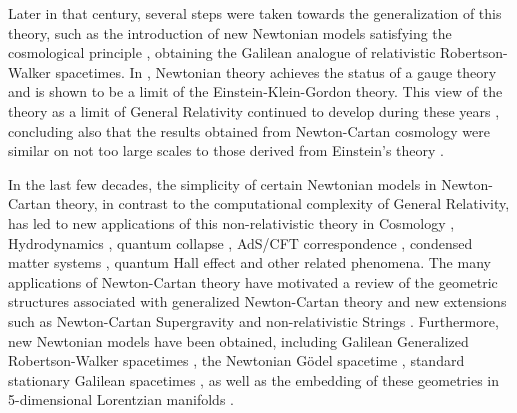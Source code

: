 \documentclass[12pt]{article}
\begin{document}
Later in that century, several steps were taken towards the generalization of this theory, such as the introduction of new Newtonian models satisfying the cosmological principle \cite{Muler1983}, obtaining the Galilean analogue of relativistic Robertson-Walker spacetimes. In \cite{Duval}, Newtonian theory achieves the status of a gauge theory and is shown to be a limit of the Einstein-Klein-Gordon theory. This view of the theory as a limit of General Relativity continued to develop during these years \cite{Leih}, concluding also that the results obtained from Newton-Cartan cosmology were similar on not too large scales to those derived from Einstein's theory \cite{Rod, Ruede}.

In the last few decades, the simplicity of certain Newtonian models in Newton-Cartan theory, in contrast to the computational complexity of General Relativity, has led to new applications of this non-relativistic theory in Cosmology \cite{Bra}, Hydrodynamics \cite{Geracie2}, quantum collapse \cite{Pen}, AdS/CFT correspondence \cite{Lin}, condensed matter systems \cite{Brau}, quantum Hall effect \cite{Gera} and other related phenomena. The many applications of Newton-Cartan theory have motivated a review of the geometric structures associated with generalized Newton-Cartan theory \cite{Bernal} and new extensions such as Newton-Cartan Supergravity \cite{Roel3} and non-relativistic Strings \cite{Roel, Berg}. Furthermore, new Newtonian models have been obtained, including Galilean Generalized Robertson-Walker spacetimes \cite{GGRW}, the Newtonian G{\"o}del spacetime \cite{Costa}, standard stationary Galilean spacetimes \cite{GFPR}, as well as the embedding of these geometries in 5-dimensional Lorentzian manifolds \cite{Beka,Minguzzi2006a, Minguzzi2007, Minguzzi2010}.
 
\end{document}
